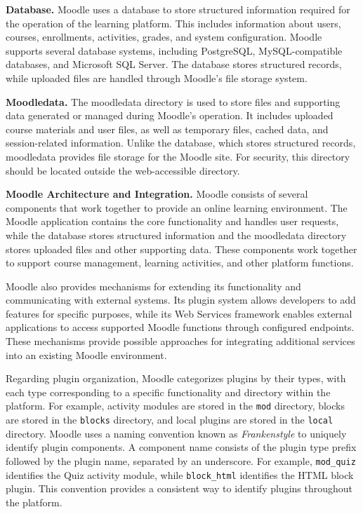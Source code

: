 \medskip
\noindent\textbf{Database.} Moodle uses a database to store structured information required for the operation of the learning platform. This includes information about users, courses, enrollments, activities, grades, and system configuration. Moodle supports several database systems, including PostgreSQL, MySQL-compatible databases, and Microsoft SQL Server. The database stores structured records, while uploaded files are handled through Moodle's file storage system.

\medskip
\noindent\textbf{Moodledata.} The moodledata directory is used to store files and supporting data generated or managed during Moodle's operation. It includes uploaded course materials and user files, as well as temporary files, cached data, and session-related information. Unlike the database, which stores structured records, moodledata provides file storage for the Moodle site. For security, this directory should be located outside the web-accessible directory.

\medskip
\noindent\textbf{Moodle Architecture and Integration.} Moodle consists of several components that work together to provide an online learning environment. The Moodle application contains the core functionality and handles user requests, while the database stores structured information and the moodledata directory stores uploaded files and other supporting data. These components work together to support course management, learning activities, and other platform functions.

Moodle also provides mechanisms for extending its functionality and communicating with external systems. Its plugin system allows developers to add features for specific purposes, while its Web Services framework enables external applications to access supported Moodle functions through configured endpoints. These mechanisms provide possible approaches for integrating additional services into an existing Moodle environment.

Regarding plugin organization, Moodle categorizes plugins by their types, with each type corresponding to a specific functionality and directory within the platform. For example, activity modules are stored in the \texttt{mod} directory, blocks are stored in the \texttt{blocks} directory, and local plugins are stored in the \texttt{local} directory. Moodle uses a naming convention known as \textit{Frankenstyle} to uniquely identify plugin components. A component name consists of the plugin type prefix followed by the plugin name, separated by an underscore. For example, \texttt{mod\_quiz} identifies the Quiz activity module, while \texttt{block\_html} identifies the HTML block plugin. This convention provides a consistent way to identify plugins throughout the platform.

